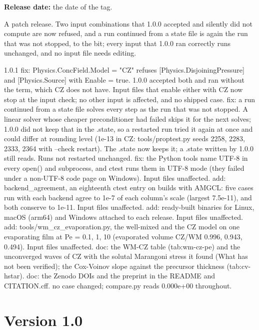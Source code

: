 \textbf{Release date:} the date of the  tag.

A patch release. Two input combinations that 1.0.0 accepted and silently did
not compute are now refused, and a run continued from a state file is again
the run that was not stopped, to the bit; every input that 1.0.0 ran correctly
runs unchanged, and no input file needs editing.

\begin{plain}
1.0.1
  fix: Physics.ConcField.Model = "CZ" refuses [Physics.DisjoiningPressure]
       and [Physics.Source] with Enable = true. 1.0.0 accepted both and ran
       without the term, which CZ does not have. Input files that enable
       either with CZ now stop at the input check; no other input is
       affected, and no shipped case.
  fix: a run continued from a state file solves every step as the run
       that was not stopped. A linear solver whose cheaper preconditioner
       had failed skips it for the next solves; 1.0.0 did not keep that in
       the .state, so a restarted run tried it again at once and could
       differ at rounding level (1e-13 in CZ: tools/proptest.py seeds 2258,
       2283, 2333, 2364 with --check restart). The .state now keeps it; a
       .state written by 1.0.0 still reads. Runs not restarted unchanged.
  fix: the Python tools name UTF-8 in every open() and subprocess, and
       ctest runs them in UTF-8 mode (they failed under a non-UTF-8 code
       page on Windows). Input files unaffected.
  add: backend_agreement, an eighteenth ctest entry on builds with AMGCL:
       five cases run with each backend agree to 1e-7 of each column's
       scale (largest 7.5e-11), and both conserve to 1e-11. Input files
       unaffected.
  add: ready-built binaries for Linux, macOS (arm64) and Windows attached
       to each release. Input files unaffected.
  add: tools/wm_cz_evaporation.py, the well-mixed and the CZ model on one
       evaporating film at Pe = 0.1, 1, 10 (evaporated volume CZ/WM 0.996,
       0.943, 0.494). Input files unaffected.
  doc: the WM-CZ table (tab:wm-cz-pe) and the unconverged waves of CZ with
       the solutal Marangoni stress it found (What has not been verified); the
       Cox-Voinov slope against the precursor thickness (tab:cv-hstar).
  doc: the Zenodo DOIs and the preprint in the README and CITATION.cff.
  no case changed; compare.py reads 0.000e+00 throughout.
\end{plain}

\section{Version 1.0}
\label{sec:rev:1-0}


